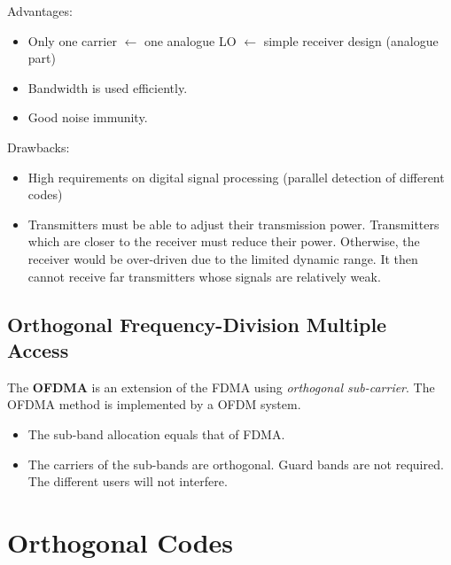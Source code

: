 \begin{refsection}
Advantages:
\begin{itemize}
	\item Only one carrier $\leftarrow$ one analogue \ac{LO} $\leftarrow$ simple receiver design (analogue part)
	\item Bandwidth is used efficiently.
	\item Good noise immunity.
\end{itemize}

Drawbacks:
\begin{itemize}
	\item High requirements on digital signal processing (parallel detection of different codes)
	\item Transmitters must be able to adjust their transmission power. Transmitters which are closer to the receiver must reduce their power. Otherwise, the receiver would be over-driven due to the limited dynamic range. It then cannot receive far transmitters whose signals are relatively weak.
\end{itemize}

\subsection{Orthogonal Frequency-Division Multiple Access}

The  \textbf{\acf{OFDMA}} is an extension of the \ac{FDMA} using \emph{orthogonal sub-carrier}. The \ac{OFDMA} method is implemented by a \ac{OFDM} system.
\begin{itemize}
	\item The sub-band allocation equals that of \ac{FDMA}.
	\item The carriers of the sub-bands are orthogonal. Guard bands are not required. The different users will not interfere.
\end{itemize}




\section{Orthogonal Codes}


\nocite{ipatov2005}

{}
\printbibliography[heading=subbibliography]
\end{refsection}

